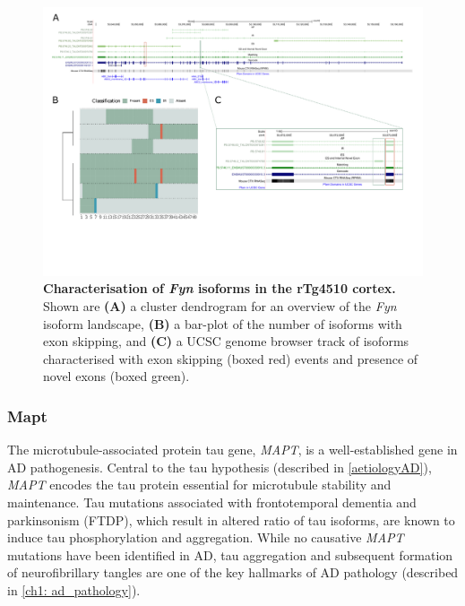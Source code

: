 \begin{landscape}
	\begin{figure}[htp]
		\centering
		\captionsetup{width=1.3\textwidth}
		\includegraphics[page=7,trim={0 1cm 0 0},scale = 0.85]{Figures/TargetGenes_Annotation_Landscape.pdf}
		\caption[Characterisation of the \textit{Fyn} isoform landscape]%
		{\textbf{Characterisation of \textit{Fyn} isoforms in the rTg4510 cortex.} Shown are \textbf{(A)} a cluster dendrogram for an overview of the \textit{Fyn} isoform landscape, \textbf{(B)} a bar-plot of the number of isoforms with exon skipping, and \textbf{(C)} a UCSC genome browser track of isoforms characterised with exon skipping (boxed red) events and presence of novel exons (boxed green).}    
		\label{fig:fyn}
	\end{figure}
\end{landscape}
\restoregeometry

\newpage
\subsubsection{Mapt}
The microtubule-associated protein tau gene, \textit{MAPT}, is a well-established gene in AD pathogenesis. Central to the tau hypothesis (described in \cref{aetiologyAD}), \textit{MAPT} encodes the tau protein essential for microtubule stability and maintenance. Tau mutations associated with frontotemporal dementia and parkinsonism (FTDP), which result in altered ratio of tau isoforms, are known to induce tau phosphorylation and aggregation\cite{Bowles2022}. While no causative \textit{MAPT} mutations have been identified in AD, tau aggregation and subsequent formation of neurofibrillary tangles are one of the key hallmarks of AD pathology (described in \cref{ch1: ad_pathology}). 

